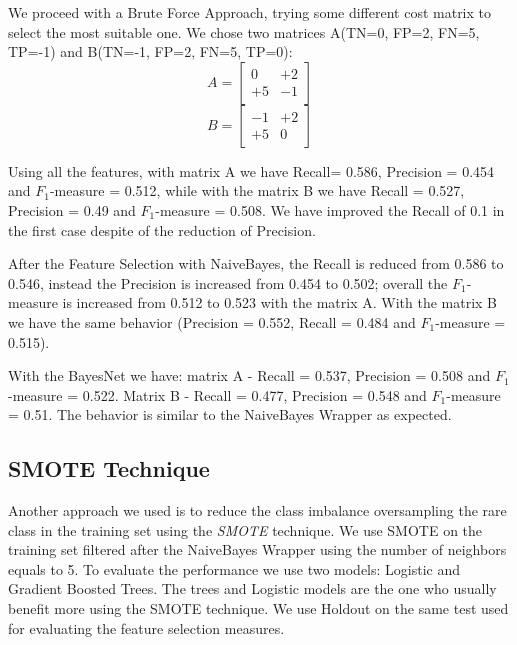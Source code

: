 \documentclass[fleqn,10pt]{SelfArx} %
\begin{document}
We proceed with a Brute Force Approach, trying some different cost matrix to select the most suitable one. \newline
We chose two matrices A(TN=0, FP=2, FN=5, TP=-1) and B(TN=-1, FP=2, FN=5, TP=0):
$$
A=\begin{bmatrix} 
0 & +2 \\
+5 & -1 
\end{bmatrix}
$$
$$
B=\begin{bmatrix} 
-1 & +2 \\
+5 & 0 
\end{bmatrix}
$$ 

Using all the features, with matrix A we have Recall= 0.586, Precision = 0.454 and $F_1$-measure = 0.512, while with the matrix B we have Recall = 0.527, Precision = 0.49 and $F_1$-measure = 0.508. 
We have improved the Recall of 0.1 in the first case despite of the reduction of Precision.

After the Feature Selection with NaiveBayes, the Recall is reduced from 0.586 to 0.546, instead the Precision is increased from 0.454 to 0.502; overall the $F_1$-measure is increased from 0.512 to 0.523 with the matrix A. 
With the matrix B we have the same behavior (Precision = 0.552, Recall = 0.484 and $F_1$-measure = 0.515). 

With the BayesNet we have: matrix A - Recall = 0.537, Precision = 0.508 and $F_1$-measure = 0.522. Matrix B - Recall = 0.477, Precision = 0.548 and $F_1$-measure = 0.51. 
The behavior is similar to the NaiveBayes Wrapper as expected.  

\subsection{SMOTE Technique \cite{SMOTE}}
Another approach we used is to reduce the class imbalance oversampling the rare class in the training set using the \textit{SMOTE} technique. \newline
We use SMOTE on the training set filtered after the NaiveBayes Wrapper using the number of neighbors equals to 5. 
To evaluate the performance we use two models: Logistic and Gradient Boosted Trees. The trees and Logistic models are the one who usually benefit more using the SMOTE technique. 
We use Holdout on the same test used for evaluating the feature selection measures. 
\end{document}
